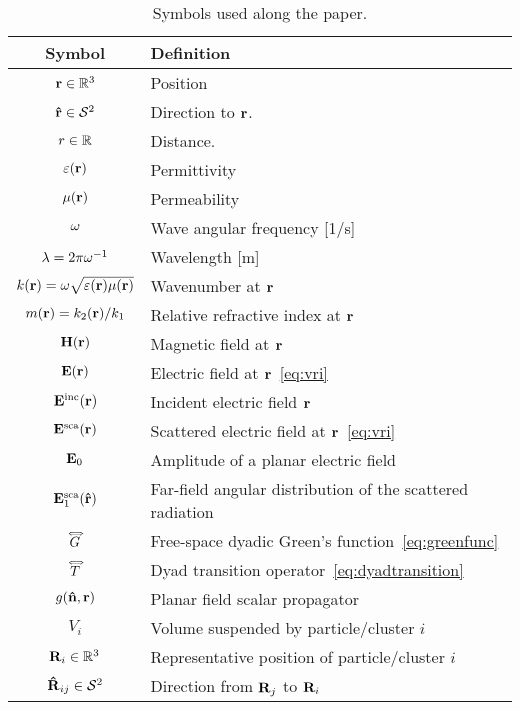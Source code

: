 \begin{table}[t]
    \caption{Symbols used along the paper.}
    \label{tb:symbols}
    \footnotesize
    \addtolength{\tabcolsep}{-1pt}
    \renewcommand{\arraystretch}{1.1}
    \begin{tabular}{cl}
        \textbf{Symbol}   & \textbf{Definition} \\ 
        \toprule
        $\mathbf{r}\in\mathbb{R}^3$ & Position \\
        $\mathbf{\hat{r}}\in\mathcal{S}^2$ & Direction to $\mathbf{r}$. \\
        $r\in\mathbb{R}$ & Distance. \\
        \hline
        $\varepsilon(\mathbf{r})$ & Permittivity \\
        $\mu(\mathbf{r})$ & Permeability \\
        $\omega$ & Wave angular frequency [1/s] \\
        $\lambda=2\pi\omega^{-1}$ & Wavelength [m] \\
        $k(\mathbf{r})=\omega\sqrt{\varepsilon(\mathbf{r})\mu(\mathbf{r})}$ & Wavenumber at $\mathbf{r}$\\
        $m(\mathbf{r})=k_2(\mathbf{r})/k_1$ & Relative refractive index at $\mathbf{r}$ \\
        \hline
        $\mathbf{H}(\mathbf{r})$ & Magnetic field at $\mathbf{r}$ \\
        $\mathbf{E}(\mathbf{r})$   & Electric field at $\mathbf{r}$~\eqref{eq:vri}  \\
        $\mathbf{E}^\text{inc}(\mathbf{r})$ & Incident electric field $\mathbf{r}$\\
        $\mathbf{E}^\text{sca}(\mathbf{r})$ & Scattered electric field at $\mathbf{r}$~\eqref{eq:vri}\\ 
        $\mathbf{E}_0$ & Amplitude of a planar electric field \\
        $\mathbf{E}^\text{sca}_1(\mathbf{\hat{r}})$ & Far-field angular distribution of the scattered radiation  \\
        \hline
        $\accentset{\Longleftrightarrow}{G}$ & Free-space dyadic Green's function~\eqref{eq:greenfunc} \\
        $\accentset{\Longleftrightarrow}{T}$ & Dyad transition operator~\eqref{eq:dyadtransition}\\
        $g(\mathbf{\hat{n}},\mathbf{r})$ & Planar field scalar propagator \\
        \hline
        \hline
        $V_i$ & Volume suspended by particle/cluster $i$ \\
        $\mathbf{R}_i\in\mathbb{R}^3$ & Representative position of particle/cluster $i$ \\
        $\mathbf{\hat{R}}_{ij}\in\mathcal{S}^2$ & Direction from $\mathbf{R}_j$ to $\mathbf{R}_i$\\

\end{tabular}
\end{table}
